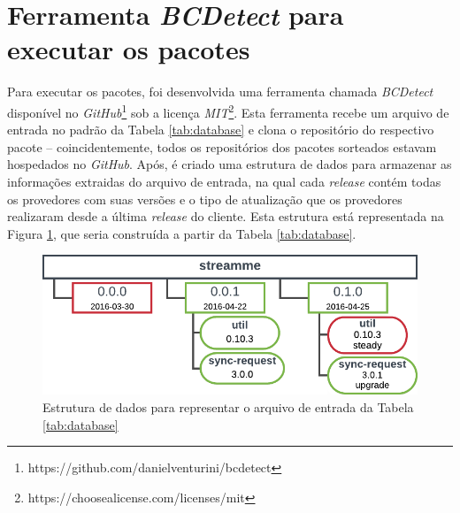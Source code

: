 \section{Ferramenta \textit{BCDetect} para executar os pacotes}
\label{sec:bcdetect}
Para executar os pacotes, foi desenvolvida uma ferramenta chamada \textit{BCDetect} disponível no \textit{GitHub}\footnote{https://github.com/danielventurini/bcdetect} sob a licença \textit{MIT}\footnote{https://choosealicense.com/licenses/mit}. Esta ferramenta recebe um arquivo de entrada no padrão da Tabela \ref{tab:database} e clona o repositório do respectivo pacote -- coincidentemente, todos os repositórios dos pacotes sorteados estavam hospedados no \textit{GitHub}. Após, é criado uma estrutura de dados para armazenar as informações extraidas do arquivo de entrada, na qual cada \textit{release} contém todas os provedores com suas versões e o tipo de atualização que os provedores realizaram desde a última \textit{release} do cliente. Esta estrutura está representada na Figura \ref{fig:bc_work}, que seria construída a partir da Tabela \ref{tab:database}.

\begin{figure}
    \centering
    \includegraphics{figuras/bcdetect_work.png}
    \caption{Estrutura de dados para representar o arquivo de entrada da Tabela \ref{tab:database}}
    \label{fig:bc_work}
\end{figure}{}

